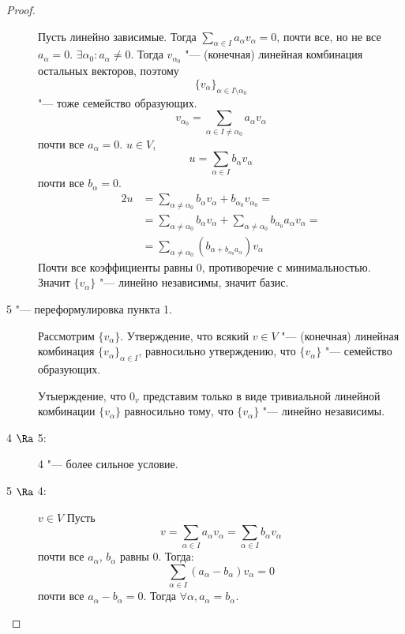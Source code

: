 \begin{proof}
\begin{description}
		Пусть линейно зависимые. Тогда $\sum_{\alpha \in I} a_{\alpha}v_{\alpha} = 0$, почти все, но не все $a_{\alpha} = 0$.
		$\exists \alpha_0: a_{\alpha} \ne 0$. Тогда
		$v_{\alpha_0}$ "--- (конечная) линейная комбинация остальных векторов, поэтому
		\[ \{v_{\alpha}\}_{\alpha \in I \setminus {\alpha_0}} \]
		"--- тоже семейство образующих.
		\[ v_{\alpha_0} = \sum_{\alpha \in I \ne \alpha_0} a_{\alpha}v_{\alpha} \]
		почти все $a_{\alpha} = 0$.
		$u \in V$,
		\[ u = \sum_{\alpha \in I}b_{\alpha}v_{\alpha} \]
		почти все $b_{\alpha} = 0$.
		\begin{alignat*}{2}
			u &= \sum_{\alpha \ne \alpha_{0}}b_{\alpha}v_{\alpha} + b_{\alpha_0}v_{\alpha_0} = \\
			  &= \sum_{\alpha \ne \alpha_{0}}b_{\alpha}v_{\alpha} + \sum_{\alpha \ne \alpha_{0}}b_{\alpha_0}a_{\alpha}v_{\alpha} = \\
			  &= \sum _{\alpha \ne \alpha_0}(b_{\alpha + b_{\alpha_0}a_{\alpha}})v_{\alpha}
		\end{alignat*}
		Почти все коэффициенты равны 0, противоречие с минимальностью. Значит $\{v_{\alpha}\}$ "--- линейно независимы, значит базис.

	\item [5 "--- переформулировка пункта 1.]
		Рассмотрим $\{v_{\alpha}\}$.
		Утверждение, что всякий $v \in V$ "--- (конечная) линейная комбинация $\{v_{\alpha}\}_{\alpha \in I}$, равносильно
		утверждению, что $\{v_{\alpha}\}$ "--- семейство образующих.

		Утыерждение, что $0_v$ представим только в виде тривиальной линейной комбинации $\{v_{\alpha}\}$ равносильно тому,
		что $\{v_{\alpha}\}$ "--- линейно независимы.

	\item [4 $\Ra$ 5:]
		4 "--- более сильное условие.

	\item [5 $\Ra$ 4:]
		$v \in V$
		Пусть
		\[ v = \sum_{\alpha \in I}a_{\alpha}v_{\alpha} = \sum_{\alpha \in I} b_{\alpha}v_{\alpha} \]
		почти все $a_{\alpha}$, $b_{\alpha}$ равны 0. Тогда:
		\[ \sum_{\alpha \in I}(a_{\alpha} - b_{\alpha})v_{\alpha} = 0 \]
		почти все $a_{\alpha} - b_{\alpha} = 0$.
		Тогда $\forall \alpha, a_\alpha = b_\alpha$.
	\end{description}
\end{proof}

